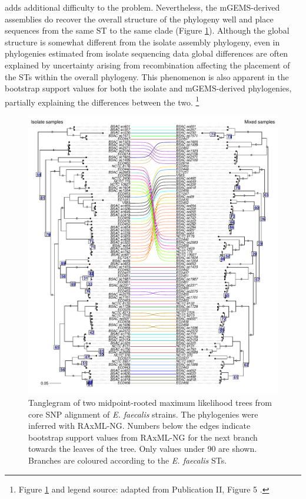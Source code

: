 \documentclass[officiallayout]{tktla}
\let\svthefootnote\thefootnote
\begin{document}
adds additional difficulty to the problem. Nevertheless, the
mGEMS-derived assemblies do recover the overall structure of the
phylogeny well and place sequences from the same ST to the same clade
(Figure \ref{fig:mgems-efaecalis-phylogeny}). Although the global structure is somewhat
different from the isolate assembly phylogeny, even in phylogenies
estimated from isolate sequencing data global differences are often
explained by uncertainty arising from recombination affecting the
placement of the STs within the overall phylogeny. This phenomenon is
also apparent in the bootstrap support values for both the isolate and
mGEMS-derived phylogenies, partially explaining the differences
between the two.
\noindent\let\thefootnote\relax\footnote{Figure \ref{fig:mgems-efaecalis-phylogeny} and legend source: adapted from Publication II, Figure 5 \citep{maklin_bacterial_2021}.}
\addtocounter{footnote}{-1}\let\thefootnote\svthefootnote
\begin{figure}[!ht]
    \centering
    \includegraphics[height=0.75\textheight,width=\textwidth,keepaspectratio]{img/reproduced/MGen2021_mGEMS_Figure_5.pdf}
    \caption{Tanglegram of two midpoint-rooted maximum likelihood
      trees from core SNP alignment of \textit{E. faecalis}
      strains. The phylogenies were inferred with RAxML-NG. Numbers
      below the edges indicate bootstrap support values from RAxML-NG
      for the next branch towards the leaves of the tree. Only values under 90 are shown. Branches are
      coloured according to the \textit{E. faecalis} STs.}
    \label{fig:mgems-efaecalis-phylogeny}
\end{figure}
\end{document}
